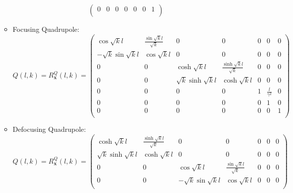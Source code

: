 \begin{itemize}
\begin{itemize}
\begin{equation*}
\begin{pmatrix}
                                             0 & 0 & 0 & 0 & 0 & 0 & 1 \\
                                         \end{pmatrix}
            \end{equation*}
        \item Focusing Quadrupole:
            \begin{equation*}
                Q(l,k) = R_{\bm{x}}^Q (l,k) = \begin{pmatrix}
                                                  \cos{\sqrt{k} l} & \frac{\sin{\sqrt{k} l}}{\sqrt{k}} & 0 & 0 & 0 & 0 & 0 \\ %
                                                  -\sqrt{k}\sin{\sqrt{k} l} & \cos{\sqrt{k} l} & 0 & 0 & 0 & 0 & 0 \\ %
                                                  0 & 0 & \cosh{\sqrt{k} l} & \frac{\sinh{\sqrt{k} l}}{\sqrt{k}} & 0 & 0 & 0 \\ %
                                                  0 & 0 & \sqrt{k}\sinh{\sqrt{k} l} & \cosh{\sqrt{k} l} & 0 & 0 & 0 \\ %
                                                  0 & 0 & 0 & 0 & 1 & \frac{l}{\gamma^2} & 0 \\ %
                                                  0 & 0 & 0 & 0 & 0 & 1 & 0 \\ %
                                                  0 & 0 & 0 & 0 & 0 & 0 & 1 \\
                                              \end{pmatrix}
            \end{equation*}
        \item Defocusing Quadrupole:
            \begin{equation*}
                Q(l,k) = R_{\bm{x}}^Q (l,k) = \begin{pmatrix}
                                                  \cosh{\sqrt{k} l} & \frac{\sinh{\sqrt{k} l}}{\sqrt{k}} & 0 & 0 & 0 & 0 & 0 \\ %
                                                  \sqrt{k}\sinh{\sqrt{k} l} & \cosh{\sqrt{k} l} & 0 & 0 & 0 & 0 & 0 \\ %
                                                  0 & 0 & \cos{\sqrt{k} l} & \frac{\sin{\sqrt{k} l}}{\sqrt{k}} & 0 & 0 & 0 \\ %
                                                  0 & 0 & -\sqrt{k}\sin{\sqrt{k} l} & \cos{\sqrt{k} l} & 0 & 0 & 0  \\ %

\end{pmatrix}
\end{equation*}
\end{itemize}
\end{itemize}
